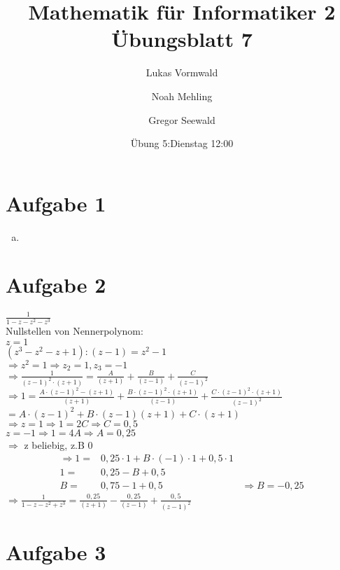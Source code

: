 \documentclass[11pt,a4paper]{article}
\title{Mathematik für Informatiker 2\\Übungsblatt 7}
\author{Lukas Vormwald \and Noah Mehling \and Gregor Seewald}
\date{Übung 5:Dienstag 12:00}
\begin{document}
  \section*{Aufgabe 1}

    \begin{enumerate}[a)]
      \item
    \end{enumerate}

  \section*{Aufgabe 2}

    $\frac{1}{1-z-z^2-z^3}$\\
    Nullstellen von Nennerpolynom:\\
    $z=1$\\
    $(z^3-z^2-z+1) : (z-1)=z^2-1$\\
    $\Rightarrow z^2=1 \Rightarrow z_2=1,z_3=-1$\\
    $\Rightarrow \frac{1}{\left(z-1\right)^2\cdot\left(z+1\right)}=\frac{A}{\left(z+1\right)}+\frac{B}{\left(z-1\right)}+\frac{C}{\left(z-1\right)^2}$\\
    $\Rightarrow 1=\frac{A\cdot \left(z-1\right)^2-\left(z+1\right)}{\left(z+1\right)}+\frac{B\cdot \left(z-1\right)^2\cdot \left(z+1\right)}{\left(z-1\right)}+\frac{C\cdot \left(z-1\right)^2\cdot\left(z+1\right)}{\left(z-1\right)^2}$\\
    $=A\cdot \left(z-1\right)^2+B\cdot\left(z-1\right)\left(z+1\right)+C\cdot\left(z+1\right)$\\
    $\Rightarrow z=1 \Rightarrow 1=2C \Rightarrow C=0,5$\\
    $z=-1 \Rightarrow 1=4A \Rightarrow A=0,25$\\
    $\Rightarrow$ z beliebig, z.B $0$\\
    \begin{align*}
      \Rightarrow 1 =& 0,25 \cdot 1 + B \cdot \left( -1 \right) \cdot 1 + 0,5 \cdot 1\\
      1 =& 0,25 - B + 0,5\\
      B =& 0,75 - 1 + 0,5 &\Rightarrow B = -0,25
    \end{align*}
    $\Rightarrow \frac{1}{1-z-z^2+z^3} = \frac{0,25}{\left(z+1\right)} - \frac{0,25}{\left(z-1\right)}+ \frac{0,5}{\left(z-1\right)^2}$

  \section*{Aufgabe 3}
\end{document}

